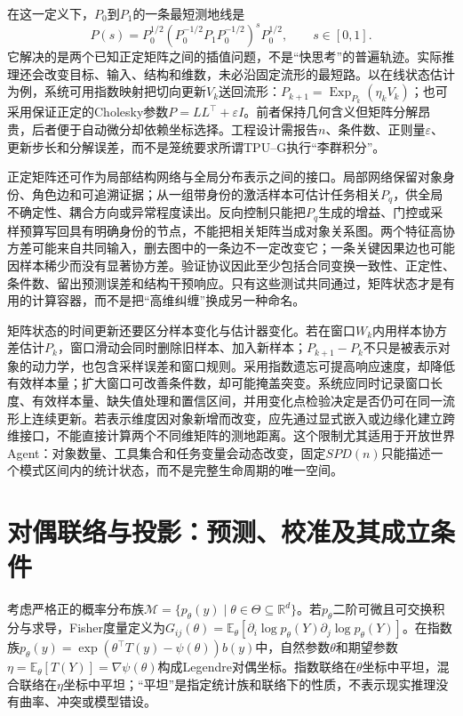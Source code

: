 在这一定义下，$P_0$到$P_1$的一条最短测地线是
\begin{equation}
P(s)=P_0^{1/2}\left(P_0^{-1/2}P_1P_0^{-1/2}\right)^sP_0^{1/2},\qquad s\in[0,1].
\end{equation}
它解决的是两个已知正定矩阵之间的插值问题，不是“快思考”的普遍轨迹。实际推理还会改变目标、输入、结构和维数，未必沿固定流形的最短路。以在线状态估计为例，系统可用指数映射把切向更新$V_k$送回流形：$P_{k+1}=\operatorname{Exp}_{P_k}(\eta_kV_k)$；也可采用保证正定的Cholesky参数$P=LL^\top+\varepsilon I$。前者保持几何含义但矩阵分解昂贵，后者便于自动微分却依赖坐标选择。工程设计需报告$n$、条件数、正则量$\varepsilon$、更新步长和分解误差，而不是笼统要求所谓TPU--G执行“李群积分”。

正定矩阵还可作为局部结构网络与全局分布表示之间的接口。局部网络保留对象身份、角色边和可追溯证据；从一组带身份的激活样本可估计任务相关$P_q$，供全局不确定性、耦合方向或异常程度读出。反向控制只能把$P_q$生成的增益、门控或采样预算写回具有明确身份的节点，不能把相关矩阵当成对象关系图。两个特征高协方差可能来自共同输入，删去图中的一条边不一定改变它；一条关键因果边也可能因样本稀少而没有显著协方差。验证协议因此至少包括合同变换一致性、正定性、条件数、留出预测误差和结构干预响应。只有这些测试共同通过，矩阵状态才是有用的计算容器，而不是把“高维纠缠”换成另一种命名。

矩阵状态的时间更新还要区分样本变化与估计器变化。若在窗口$W_k$内用样本协方差估计$P_k$，窗口滑动会同时删除旧样本、加入新样本；$P_{k+1}-P_k$不只是被表示对象的动力学，也包含采样误差和窗口规则。采用指数遗忘可提高响应速度，却降低有效样本量；扩大窗口可改善条件数，却可能掩盖突变。系统应同时记录窗口长度、有效样本量、缺失值处理和置信区间，并用变化点检验决定是否仍可在同一流形上连续更新。若表示维度因对象新增而改变，应先通过显式嵌入或边缘化建立跨维接口，不能直接计算两个不同维矩阵的测地距离。这个限制尤其适用于开放世界Agent：对象数量、工具集合和任务变量会动态改变，固定$SPD(n)$只能描述一个模式区间内的统计状态，而不是完整生命周期的唯一空间。

\section{对偶联络与投影：预测、校准及其成立条件}
\label{sec:section_6511}

考虑严格正的概率分布族$\mathcal M=\{p_\theta(y)\mid\theta\in\Theta\subseteq\mathbb R^d\}$。若$p_\theta$二阶可微且可交换积分与求导，Fisher度量定义为$G_{ij}(\theta)=\mathbb E_\theta[\partial_i\log p_\theta(Y)\partial_j\log p_\theta(Y)]$。在指数族$p_\theta(y)=\exp(\theta^\top T(y)-\psi(\theta))b(y)$中，自然参数$\theta$和期望参数$\eta=\mathbb E_\theta[T(Y)]=\nabla\psi(\theta)$构成Legendre对偶坐标。指数联络在$\theta$坐标中平坦，混合联络在$\eta$坐标中平坦；“平坦”是指定统计族和联络下的性质，不表示现实推理没有曲率、冲突或模型错设。

